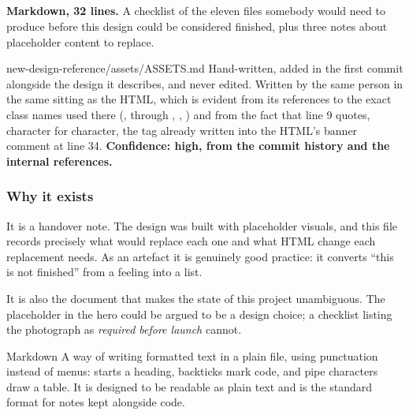 \subsection{}

\textbf{Markdown, 32 lines.} A checklist of the eleven files somebody would need to
produce before this design could be considered finished, plus three notes about
placeholder content to replace.

\begin{provenance}{new-design-reference/assets/ASSETS.md}
Hand-written, added in the first commit  alongside the design it
describes, and never edited. Written by the same person in the same sitting as the
HTML, which is evident from its references to the exact class names used there
(,  through , ,
) and from the fact that line 9 quotes, character for character, the
 tag already written into the HTML's banner comment at line 34.
\textbf{Confidence: high, from the commit history and the internal references.}
\end{provenance}

\subsubsection*{Why it exists}

It is a handover note. The design was built with placeholder visuals, and this file
records precisely what would replace each one and what HTML change each replacement
needs. As an artefact it is genuinely good practice: it converts ``this is not
finished'' from a feeling into a list.

It is also the document that makes the state of this project unambiguous. The
placeholder in the hero could be argued to be a design choice; a checklist listing
the photograph as \emph{required before launch} cannot.

\begin{jargon}{Markdown}
A way of writing formatted text in a plain file, using punctuation instead of menus:
\code{\#} starts a heading, backticks mark code, and pipe characters draw a table. It
is designed to be readable as plain text and is the standard format for notes kept
alongside code.
\end{jargon}

